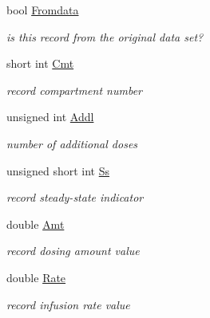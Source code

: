 \begin{DoxyCompactItemize}
bool \hyperlink{classdatarecord_a2e94c47f9bb5e6f3acb484c495f2a2d5}{Fromdata}
\begin{DoxyCompactList}\small\item\em is this record from the original data set? \end{DoxyCompactList}\item 
\mbox{\label{classdatarecord_a2e230dc739a8b5d8b8baec949da5c7e9}} 
short int \hyperlink{classdatarecord_a2e230dc739a8b5d8b8baec949da5c7e9}{Cmt}
\begin{DoxyCompactList}\small\item\em record compartment number \end{DoxyCompactList}\item 
\mbox{\label{classdatarecord_ad839f3c35f703608ec48d5f2c923c4e4}} 
unsigned int \hyperlink{classdatarecord_ad839f3c35f703608ec48d5f2c923c4e4}{Addl}
\begin{DoxyCompactList}\small\item\em number of additional doses \end{DoxyCompactList}\item 
\mbox{\label{classdatarecord_a807f7e14eb4944decdc46e648a47d7fc}} 
unsigned short int \hyperlink{classdatarecord_a807f7e14eb4944decdc46e648a47d7fc}{Ss}
\begin{DoxyCompactList}\small\item\em record steady-\/state indicator \end{DoxyCompactList}\item 
\mbox{\label{classdatarecord_abd16b2ebb7bbb802e48d8953c54a8dbc}} 
double \hyperlink{classdatarecord_abd16b2ebb7bbb802e48d8953c54a8dbc}{Amt}
\begin{DoxyCompactList}\small\item\em record dosing amount value \end{DoxyCompactList}\item 
\mbox{\label{classdatarecord_a8365af91440e533bd8c246ffc1e38590}} 
double \hyperlink{classdatarecord_a8365af91440e533bd8c246ffc1e38590}{Rate}
\begin{DoxyCompactList}\small\item\em record infusion rate value \end{DoxyCompactList}\item 

\end{DoxyCompactItemize}

